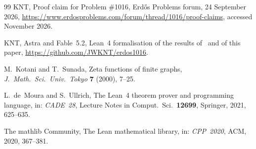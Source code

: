 \documentclass[11pt]{article}
\theoremstyle{definition}
\theoremstyle{remark}
\numberwithin{equation}{section}
\begin{document}
\begin{thebibliography}{99}
 KNT, Proof claim for Problem \#1016, Erd\H{o}s Problems forum, 24 September 2026,
\url{https://www.erdosproblems.com/forum/thread/1016/proof-claims}, accessed November 2026.

 KNT, Astra and Fable~5.2, Lean~4 formalisation of the results of~\cite{KNT} and of
this paper, \url{https://github.com/JWKNT/erdos1016}.

 M.~Kotani and T.~Sunada, Zeta functions of finite graphs, \emph{J.~Math.\ Sci.\ Univ.\
Tokyo} \textbf{7} (2000), 7--25.

 L.~de~Moura and S.~Ullrich, The Lean~4 theorem prover and programming language,
in: \emph{CADE~28}, Lecture Notes in Comput.\ Sci.\ \textbf{12699}, Springer, 2021, 625--635.

 The mathlib Community, The Lean mathematical library, in: \emph{CPP~2020}, ACM,
2020, 367--381.

\end{thebibliography}
\end{document}
